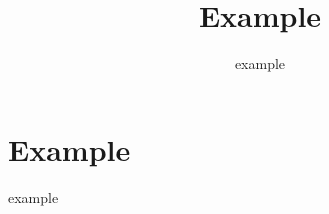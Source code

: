 \documentclass[a4j]{jsarticle}
\title{Example}
\author{example}
\begin{document}
\maketitle

\section{Example}
example
\end{document}

